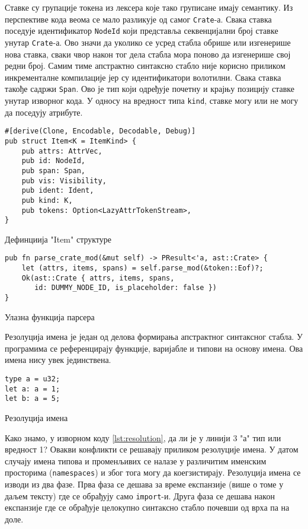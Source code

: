 Ставке су групације токена из лексера које тако груписане имају семантику. Из перспективе кода 
веома се мало разликује од самог \verb|Crate|-а. Свака ставка поседује идентификатор \verb|NodeId| 
који представља секвенцијални број ставке унутар \verb|Crate|-а. Ово значи да уколико се усред стабла 
обрише или изгенерише нова ставка, сваки чвор након тог дела стабла мора поново да изгенерише свој редни број.
Самим тиме апстрактно синтаксно стабло није корисно приликом инкременталне компилације јер су идентификатори
волотилни. Свака ставка такође садржи \verb|Span|. Ово је тип који одређује почетну и крајњу позицију 
ставке унутар изворног кода. У односу на вредност типа \verb|kind|, ставке могу или не могу да поседују атрибуте. 

\begin{listing}[H]
\begin{verbatim}
#[derive(Clone, Encodable, Decodable, Debug)]
pub struct Item<K = ItemKind> {
    pub attrs: AttrVec,
    pub id: NodeId,
    pub span: Span,
    pub vis: Visibility,
    pub ident: Ident,
    pub kind: K,
    pub tokens: Option<LazyAttrTokenStream>,
}
\end{verbatim}
\caption{Дефинциија "Item" структуре}
\end{listing}

\begin{listing}[H]
\begin{verbatim}
pub fn parse_crate_mod(&mut self) -> PResult<'a, ast::Crate> {
    let (attrs, items, spans) = self.parse_mod(&token::Eof)?;
    Ok(ast::Crate { attrs, items, spans, 
       id: DUMMY_NODE_ID, is_placeholder: false })
}
\end{verbatim}
\caption{Улазна функција парсера}
\end{listing}


Резолуција имена је један од делова формирања апстрактног синтаксног стабла.
У програмима се референцирају функције, варијабле и типови на основу имена. Ова имена нису увек јединствена.

\begin{listing}[H]
\begin{verbatim}
type a = u32;
let a: a = 1;
let b: a = 5; 
\end{verbatim}
\caption{Резолуција имена}
\label{lst:resolution}
\end{listing}

Како знамо, у изворном коду \ref{lst:resolution}, да ли је у линији 3 "а" тип или вредност 1?
Овакви конфликти се решавају приликом резолуције имена. У датом случају имена типова и променљивих се налазе 
у различитим именским просторима (\verb|namespaces|) и због тога могу да коегзистирају.
Резолуција имена се изводи из два фазе. Прва фаза се дешава за време експанзије (више о томе у даљем тексту) 
где се обрађују само \verb|import|-и. Друга фаза се дешава након експанзије где се обрађује целокупно 
синтаксно стабло почевши од врха па на доле. 

